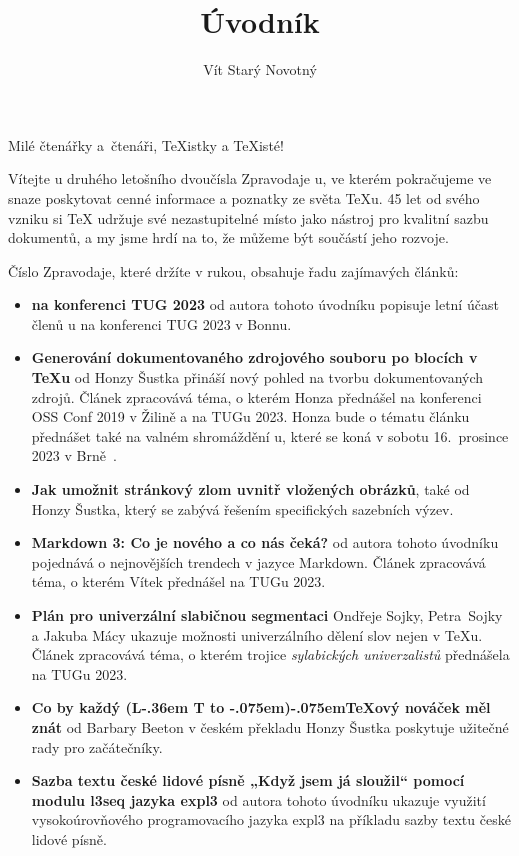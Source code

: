 \documentclass{csbulletin}
\makeatletter
\DeclareRobustCommand{\La}{L\kern-.36em%
        {\sbox\z@ T%
         \vbox to\ht\z@{\hbox{\check@mathfonts
                              \fontsize\sf@size\z@
                              \math@fontsfalse\selectfont
                              A}%
                        \vss}%
        }}
\def\AllTeX{(\La\kern-.075em)\kern-.075em\TeX}
\makeatother
\begin{document}
\title{Úvodník}
\author{Vít Starý Novotný}
\maketitle

Milé čtenářky a~čtenáři, \TeX istky a \TeX isté!

\medskip

Vítejte u druhého letošního dvoučísla Zpravodaje \CSTUG u, ve kterém pokračujeme ve snaze poskytovat cenné informace a poznatky ze světa \TeX u. 45 let od svého vzniku si \TeX{} udržuje své nezastupitelné místo jako nástroj pro kvalitní sazbu dokumentů, a my jsme hrdí na to, že můžeme být součástí jeho rozvoje.

Číslo Zpravodaje, které držíte v rukou, obsahuje řadu zajímavých článků:

\begin{itemize}
  \item \textbf{\CSTUG{} na konferenci TUG 2023} od autora tohoto úvodníku popisuje letní účast členů \CSTUG u na konferenci TUG 2023 v Bonnu.
  \item \textbf{Generování dokumentovaného zdrojového souboru po blocích v \TeX u} od Honzy Šustka přináší nový pohled na tvorbu dokumentovaných zdrojů. Článek zpracovává téma, o kterém Honza přednášel na konferenci OSS Conf 2019 v Žilině a na TUGu 2023. Honza bude o tématu článku přednášet také na valném shromáždění \CSTUG u, které se koná v sobotu 16.~prosince 2023 v Brně~\cite{starynovotny2023valna}.
  \item \textbf{Jak umožnit stránkový zlom uvnitř vložených obrázků}, také od Honzy Šustka, který se zabývá řešením specifických sazebních výzev.
  \item \textbf{Markdown 3: Co je nového a co nás čeká?} od autora tohoto úvodníku pojednává o nejnovějších trendech v jazyce Markdown. Článek zpracovává téma, o kterém Vítek přednášel na TUGu 2023.
  \item \textbf{Plán pro univerzální slabičnou segmentaci} Ondřeje Sojky, Petra~Sojky a Jakuba Mácy ukazuje možnosti univerzálního dělení slov nejen v \TeX u. Článek zpracovává téma, o kterém trojice \emph{sylabických univerzalistů} přednášela na TUGu 2023.
  \item \textbf{Co by každý \AllTeX ový nováček měl znát} od Barbary Beeton v českém překladu Honzy Šustka poskytuje užitečné rady pro začátečníky.
  \item \textbf{Sazba textu české lidové písně „Když jsem já
sloužil“ pomocí modulu l3seq jazyka expl3} od autora tohoto úvodníku ukazuje využití vysokoúrovňového programovacího jazyka expl3 na příkladu sazby textu české lidové písně.
\end{itemize}
\end{document}
